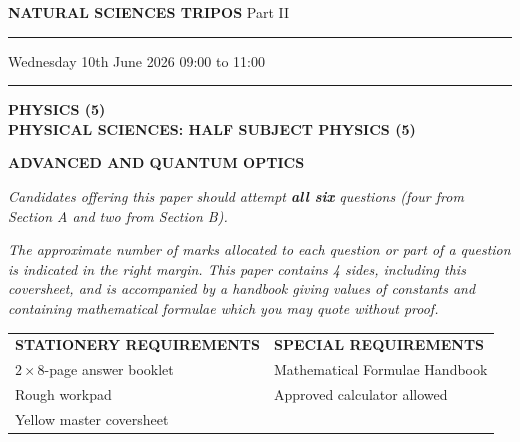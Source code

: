 \documentclass[11pt]{article}
\newcounter{question}
\begin{document}
\thispagestyle{empty}

\vspace*{0.4cm}
{\large\textbf{NATURAL SCIENCES TRIPOS} \hfill Part II}

\vspace{0.3cm}
\hrule
\vspace{0.4cm}

\noindent Wednesday 10th June 2026 \hfill 09:00 to 11:00

\vspace{0.3cm}
\hrule
\vspace{0.8cm}

{\large\textbf{PHYSICS (5)}}\\[2pt]
{\large\textbf{PHYSICAL SCIENCES: HALF SUBJECT PHYSICS (5)}}

\vspace{0.5cm}
{\large\textbf{ADVANCED AND QUANTUM OPTICS}}

\vspace{0.8cm}
\textit{Candidates offering this paper should attempt \textbf{all six} questions
(four from Section A and two from Section B).}

\vspace{0.5cm}
\textit{The approximate number of marks allocated to each question or part of a
question is indicated in the right margin. This paper contains 4 sides,
including this coversheet, and is accompanied by a handbook giving values of
constants and containing mathematical formulae which you may quote without
proof.}

\vspace{1.0cm}
\begin{tabular}{@{}p{6.4cm}p{6.4cm}@{}}
\textbf{STATIONERY REQUIREMENTS} & \textbf{SPECIAL REQUIREMENTS}\\[4pt]
$2\times8$-page answer booklet      & Mathematical Formulae Handbook\\
Rough workpad                       & Approved calculator allowed\\
Yellow master coversheet            & \\
\end{tabular}

\vspace{1.4cm}
\begin{center}
\end{center}
\end{document}
